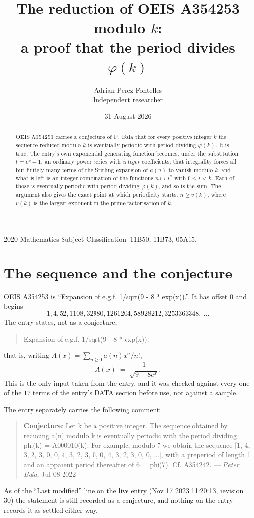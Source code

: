 \documentclass[11pt,a4paper]{article}
\title{The reduction of OEIS A354253 modulo $k$:\\ a proof that the period divides
$\varphi(k)$}
\author{Adrian Perez Fontelles\\ \small Independent researcher}
\date{31 August 2026}
\theoremstyle{plain}
\theoremstyle{definition}
\begin{document}
\maketitle

\begin{abstract}
OEIS A354253 carries a conjecture of P.~Bala that for every positive integer $k$ the
sequence reduced modulo $k$ is eventually periodic with period dividing $\varphi(k)$.
It is true. The entry's own exponential generating function becomes, under the
substitution $t=e^{x}-1$, an ordinary power series with \emph{integer} coefficients;
that integrality forces all but finitely many terms of the Stirling expansion of $a(n)$
to vanish modulo $k$, and what is left is an integer combination of the functions
$n\mapsto i^{n}$ with $0\le i<k$. Each of those is eventually periodic with period
dividing $\varphi(k)$, and so is the sum. The argument also gives the exact point at
which periodicity starts: $n\ge v(k)$, where $v(k)$ is the largest exponent in the
prime factorisation of $k$.
\end{abstract}

\noindent\small 2020 Mathematics Subject Classification. 11B50, 11B73, 05A15.\normalsize

\section{The sequence and the conjecture}

OEIS A354253 is ``Expansion of e.g.f. 1/sqrt(9 - 8 * exp(x)).''. It has offset $0$ and begins
\[
1, 4, 52, 1108, 32980, 1261204, 58928212, 3253363348,\ \dots
\]
The entry states, not as a conjecture,
\begin{quote}\small
Expansion of e.g.f. 1/sqrt(9 - 8 * exp(x)).
\end{quote}
that is, writing $A(x)=\sum_{n\ge 0}a(n)x^{n}/n!$,
\begin{equation}\label{eq:egf}
A(x)\;=\;\frac{1}{\sqrt{9-8e^{x}}}.
\end{equation}
This is the only input taken from the entry, and it was checked against every one of the
$17$ terms of the entry's DATA section before use, not against a sample.

The entry separately carries the following comment:
\begin{quote}\small
\textbf{Conjecture}: Let k be a positive integer. The sequence obtained by reducing a(n) modulo k is eventually periodic with the period dividing phi(k) = A000010(k). For example, modulo 7 we obtain the sequence [1, 4, 3, 2, 3, 0, 0, 4, 3, 2, 3, 0, 0, 4, 3, 2, 3, 0, 0, ...], with a preperiod of length 1 and an apparent period thereafter of 6 = phi(7). Cf. A354242. --- \emph{Peter Bala}, Jul 08 2022
\end{quote}
As of the ``Last modified'' line on the live entry (Nov 17 2023 11:20:13, revision
30) the statement is still recorded as a conjecture, and nothing on the entry
records it as settled either way.
\end{document}
